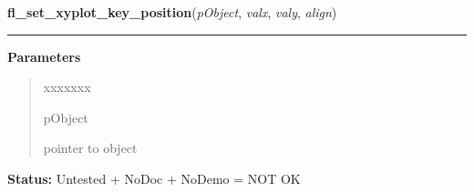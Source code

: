     \label{xformslib:library:fl_set_xyplot_key_position}

    \vspace{0.5ex}

\hspace{.8\funcindent}\begin{boxedminipage}{\funcwidth}

    \raggedright \textbf{fl\_set\_xyplot\_key\_position}(\textit{pObject}, \textit{valx}, \textit{valy}, \textit{align})

    \vspace{-1.5ex}

    \rule{\textwidth}{0.5\fboxrule}
\setlength{\parskip}{2ex}
\setlength{\parskip}{1ex}
      \textbf{Parameters}
      \vspace{-1ex}

      \begin{quote}
        \begin{Ventry}{xxxxxxx}

          \item[pObject]

          pointer to object

        \end{Ventry}

      \end{quote}

\textbf{Status:} Untested + NoDoc + NoDemo = NOT OK



    \end{boxedminipage}

    \label{xformslib:library:fl_set_xyplot_key_font}

    \vspace{0.5ex}

